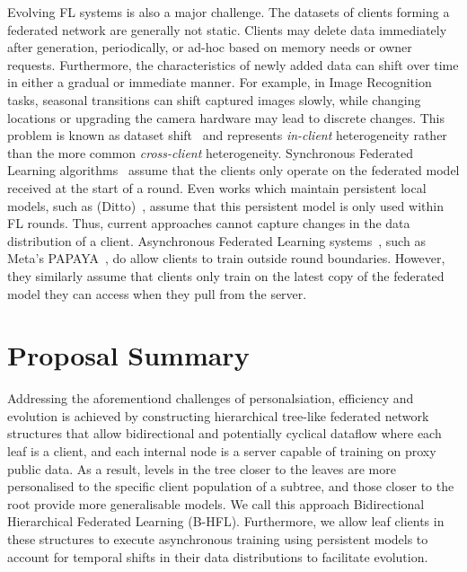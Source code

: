 Evolving FL systems is also a major challenge. The datasets of clients forming a federated network are generally not static. Clients may delete data immediately after generation, periodically, or ad-hoc based on memory needs or owner requests. Furthermore, the characteristics of newly added data can shift over time in either a gradual or immediate manner. For example, in Image Recognition tasks, seasonal transitions can shift captured images slowly, while changing locations or upgrading the camera hardware may lead to discrete changes. This problem is known as dataset shift~\citep[sec. 3.1]{AdvancedAndOpenProblems} and represents \emph{in-client} heterogeneity rather than the more common \emph{cross-client} heterogeneity. Synchronous Federated Learning algorithms~\citep{FedAvg,FedOPT,FedMA,QFedAvg,TERM} assume that the clients only operate on the federated model received at the start of a round. Even works which maintain persistent local models, such as (Ditto)~\citep{Ditto}, assume that this persistent model is only used within FL rounds. Thus, current approaches cannot capture changes in the data distribution of a client. Asynchronous Federated Learning systems~\citep{AsynchronousFLonHetDevicesSurvey,FedBuff,AsyncrhonousOnlineFL}, such as Meta's PAPAYA~\citep{PAPAYA}, do allow clients to train outside round boundaries. However, they similarly assume that clients only train on the latest copy of the federated model they can access when they pull from the server.

\section{Proposal Summary}

Addressing the aforementiond challenges of personalsiation, efficiency and evolution is achieved by constructing hierarchical tree-like federated network structures that allow bidirectional and potentially cyclical dataflow where each leaf is a client, and each internal node is a server capable of training on proxy public data. As a result, levels in the tree closer to the leaves are more personalised to the specific client population of a subtree, and those closer to the root provide more generalisable models. We call this approach Bidirectional Hierarchical Federated Learning (B-HFL). Furthermore, we allow leaf clients in these structures to execute asynchronous training using persistent models to account for temporal shifts in their data distributions to facilitate evolution.

